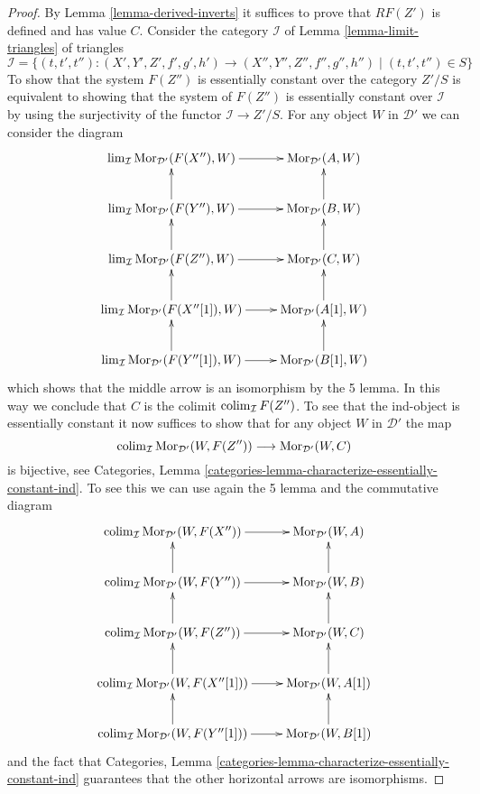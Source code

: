 \begin{proof}
\medskip\noindent
By
Lemma \ref{lemma-derived-inverts}
it suffices to prove that $RF(Z')$ is defined and has value $C$.
Consider the category $\mathcal{I}$ of
Lemma \ref{lemma-limit-triangles}
of triangles
$$
\mathcal{I} =
\{(t, t', t'') : (X', Y', Z', f', g', h') \to (X'', Y'', Z'', f'', g'', h'')
\mid (t, t', t'') \in S\}
$$
To show that the system $F(Z'')$ is essentially constant over the category
$Z'/S$ is equivalent to showing that the system of $F(Z'')$ is essentially
constant over $\mathcal{I}$ by using the surjectivity of the functor
$\mathcal{I} \to Z'/S$. For any object $W$ in $\mathcal{D}'$ we can
consider the diagram
$$
\xymatrix{
\lim_{\mathcal{I}} \text{Mor}_{\mathcal{D}'}(F(X''), W) \ar[r] &
\text{Mor}_{\mathcal{D}'}(A, W) \\
\lim_{\mathcal{I}} \text{Mor}_{\mathcal{D}'}(F(Y''), W) \ar[u] \ar[r] &
\text{Mor}_{\mathcal{D}'}(B, W) \ar[u] \\
\lim_{\mathcal{I}} \text{Mor}_{\mathcal{D}'}(F(Z''), W) \ar[u] \ar[r] &
\text{Mor}_{\mathcal{D}'}(C, W) \ar[u] \\
\lim_{\mathcal{I}} \text{Mor}_{\mathcal{D}'}(F(X''[1]), W) \ar[u]
\ar[r] &
\text{Mor}_{\mathcal{D}'}(A[1], W) \ar[u] \\
\lim_{\mathcal{I}} \text{Mor}_{\mathcal{D}'}(F(Y''[1]), W) \ar[u]
\ar[r] &
\text{Mor}_{\mathcal{D}'}(B[1], W) \ar[u]
}
$$
which shows that the middle arrow is an isomorphism by the 5 lemma.
In this way we conclude that $C$ is the colimit
$\mathop{\rm colim}\nolimits_\mathcal{I} F(Z'')$. To see that the ind-object
is essentially constant it now suffices to show that for any
object $W$ in $\mathcal{D}'$ the map
$$
\mathop{\rm colim}\nolimits_{\mathcal{I}} \text{Mor}_{\mathcal{D}'}(W, F(Z''))
\longrightarrow
\text{Mor}_{\mathcal{D}'}(W, C)
$$
is bijective, see
Categories, Lemma \ref{categories-lemma-characterize-essentially-constant-ind}.
To see this we can use again the 5 lemma and the commutative diagram
$$
\xymatrix{
\colim_{\mathcal{I}} \text{Mor}_{\mathcal{D}'}(W, F(X''))
\ar[r] &
\text{Mor}_{\mathcal{D}'}(W, A) \\
\colim_{\mathcal{I}} \text{Mor}_{\mathcal{D}'}(W, F(Y''))
\ar[u] \ar[r] &
\text{Mor}_{\mathcal{D}'}(W, B) \ar[u] \\
\colim_{\mathcal{I}} \text{Mor}_{\mathcal{D}'}(W, F(Z''))
\ar[u] \ar[r] &
\text{Mor}_{\mathcal{D}'}(W, C) \ar[u] \\
\colim_{\mathcal{I}} \text{Mor}_{\mathcal{D}'}(W, F(X''[1]))
\ar[u] \ar[r] &
\text{Mor}_{\mathcal{D}'}(W, A[1]) \ar[u] \\
\colim_{\mathcal{I}} \text{Mor}_{\mathcal{D}'}(W, F(Y''[1]))
\ar[u] \ar[r] &
\text{Mor}_{\mathcal{D}'}(W, B[1]) \ar[u]
}
$$
and the fact that
Categories, Lemma \ref{categories-lemma-characterize-essentially-constant-ind}
guarantees that the other horizontal arrows are isomorphisms.
\end{proof}

